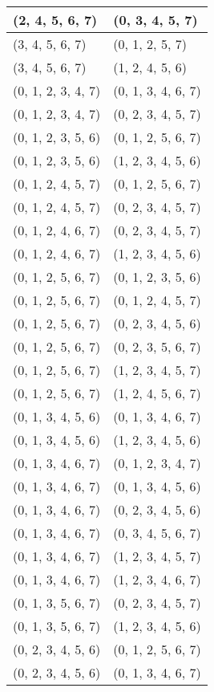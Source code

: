 \begin{footnotesize}
\begin{longtable}[c]{|l|l|}
\\ \hline
(2, 4, 5, 6, 7)
&(0, 3, 4, 5, 7)
\\ \hline
(3, 4, 5, 6, 7)
&(0, 1, 2, 5, 7)
\\ \hline
(3, 4, 5, 6, 7)
&(1, 2, 4, 5, 6)
\\ \hline
(0, 1, 2, 3, 4, 7)
&(0, 1, 3, 4, 6, 7)
\\ \hline
(0, 1, 2, 3, 4, 7)
&(0, 2, 3, 4, 5, 7)
\\ \hline
(0, 1, 2, 3, 5, 6)
&(0, 1, 2, 5, 6, 7)
\\ \hline
(0, 1, 2, 3, 5, 6)
&(1, 2, 3, 4, 5, 6)
\\ \hline
(0, 1, 2, 4, 5, 7)
&(0, 1, 2, 5, 6, 7)
\\ \hline
(0, 1, 2, 4, 5, 7)
&(0, 2, 3, 4, 5, 7)
\\ \hline
(0, 1, 2, 4, 6, 7)
&(0, 2, 3, 4, 5, 7)
\\ \hline
(0, 1, 2, 4, 6, 7)
&(1, 2, 3, 4, 5, 6)
\\ \hline
(0, 1, 2, 5, 6, 7)
&(0, 1, 2, 3, 5, 6)
\\ \hline
(0, 1, 2, 5, 6, 7)
&(0, 1, 2, 4, 5, 7)
\\ \hline
(0, 1, 2, 5, 6, 7)
&(0, 2, 3, 4, 5, 6)
\\ \hline
(0, 1, 2, 5, 6, 7)
&(0, 2, 3, 5, 6, 7)
\\ \hline
(0, 1, 2, 5, 6, 7)
&(1, 2, 3, 4, 5, 7)
\\ \hline
(0, 1, 2, 5, 6, 7)
&(1, 2, 4, 5, 6, 7)
\\ \hline
(0, 1, 3, 4, 5, 6)
&(0, 1, 3, 4, 6, 7)
\\ \hline
(0, 1, 3, 4, 5, 6)
&(1, 2, 3, 4, 5, 6)
\\ \hline
(0, 1, 3, 4, 6, 7)
&(0, 1, 2, 3, 4, 7)
\\ \hline
(0, 1, 3, 4, 6, 7)
&(0, 1, 3, 4, 5, 6)
\\ \hline
(0, 1, 3, 4, 6, 7)
&(0, 2, 3, 4, 5, 6)
\\ \hline
(0, 1, 3, 4, 6, 7)
&(0, 3, 4, 5, 6, 7)
\\ \hline
(0, 1, 3, 4, 6, 7)
&(1, 2, 3, 4, 5, 7)
\\ \hline
(0, 1, 3, 4, 6, 7)
&(1, 2, 3, 4, 6, 7)
\\ \hline
(0, 1, 3, 5, 6, 7)
&(0, 2, 3, 4, 5, 7)
\\ \hline
(0, 1, 3, 5, 6, 7)
&(1, 2, 3, 4, 5, 6)
\\ \hline
(0, 2, 3, 4, 5, 6)
&(0, 1, 2, 5, 6, 7)
\\ \hline
(0, 2, 3, 4, 5, 6)
&(0, 1, 3, 4, 6, 7)
\\ \hline

\end{longtable}
\end{footnotesize}

